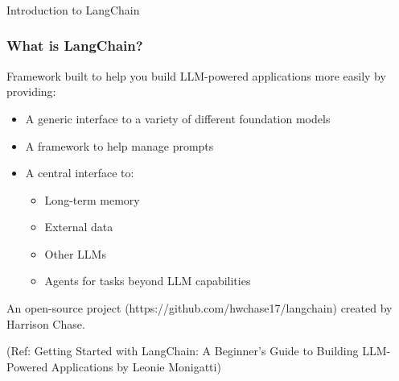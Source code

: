 \begin{frame}[fragile]\frametitle{}
\begin{center}
{\Large Introduction to LangChain}
\end{center}
\end{frame}

\begin{frame}\frametitle{What is LangChain?}

Framework built to help you build LLM-powered applications more easily by providing:

\begin{itemize}
\item A generic interface to a variety of different foundation models
\item A framework to help manage prompts 
\item A central interface to:
    \begin{itemize}
    \item Long-term memory
    \item External data
    \item Other LLMs
    \item Agents for tasks beyond LLM capabilities
    \end{itemize}
\end{itemize}

An open-source project (https://github.com/hwchase17/langchain) created by Harrison Chase.

{\tiny (Ref: Getting Started with LangChain: A Beginner's Guide to Building LLM-Powered Applications by Leonie Monigatti)}
\end{frame}

